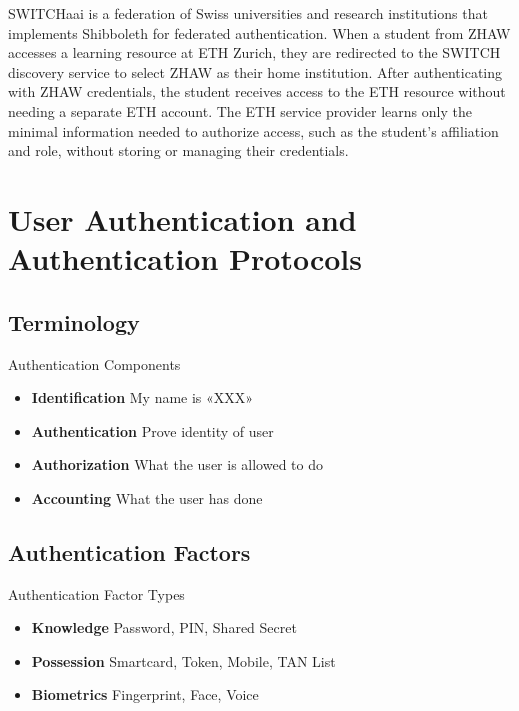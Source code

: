 \begin{example}
SWITCHaai is a federation of Swiss universities and research institutions that implements Shibboleth for federated authentication. When a student from ZHAW accesses a learning resource at ETH Zurich, they are redirected to the SWITCH discovery service to select ZHAW as their home institution. After authenticating with ZHAW credentials, the student receives access to the ETH resource without needing a separate ETH account. The ETH service provider learns only the minimal information needed to authorize access, such as the student's affiliation and role, without storing or managing their credentials.
\end{example}


\section{User Authentication and Authentication Protocols}

\subsection{Terminology}

\begin{definition}{Authentication Components}\\
    \begin{itemize}
        \item \textbf{Identification} My name is «XXX»
        \item \textbf{Authentication} Prove identity of user
        \item \textbf{Authorization} What the user is allowed to do
        \item \textbf{Accounting} What the user has done
    \end{itemize}
\end{definition}


\subsection{Authentication Factors}

\begin{definition}{Authentication Factor Types}\\
    \begin{itemize}
        \item \textbf{Knowledge} Password, PIN, Shared Secret
        \item \textbf{Possession} Smartcard, Token, Mobile, TAN List
        \item \textbf{Biometrics} Fingerprint, Face, Voice
    \end{itemize}
\end{definition}

